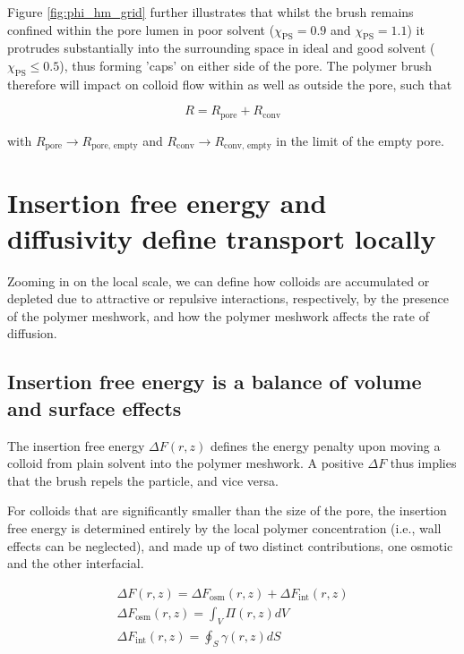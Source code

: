 \documentclass[12pt, a4paper]{article}
\begin{document}
Figure \ref{fig:phi_hm_grid} further illustrates that whilst the brush remains confined within the pore lumen in poor solvent ($\chi_{\text{PS}}=0.9$ and $\chi_{\text{PS}}=1.1$) 
it protrudes substantially into the surrounding space in ideal and good solvent ($\chi_{\text{PS}}\le0.5$), thus forming 'caps' on either side of the pore.  
The polymer brush therefore will impact on colloid flow within as well as outside the pore, such that

\begin{equation}
    R=R_{\text{pore}}+R_{\text{conv}}
    \label{eq:R_tot_tot}
\end{equation}
    
\noindent with $R_{\text{pore}}\rightarrow R_{\text{pore, empty}}$ and $R_{\text{conv}}\rightarrow R_{\text{conv, empty}}$ in the limit of the empty pore. 


\section{Insertion free energy and diffusivity define transport locally}

Zooming in on the local scale, we can define how colloids are accumulated or depleted due to attractive or repulsive interactions, respectively, by the presence of the polymer meshwork, 
and how the polymer meshwork affects the rate of diffusion.

\subsection{Insertion free energy is a balance of volume and surface effects}

The insertion free energy $\Delta F(r,z)$ defines the energy penalty upon moving a colloid from plain solvent into the polymer meshwork.
A positive $\Delta F$ thus implies that the brush repels the particle, and vice versa.

For colloids that are significantly smaller than the size of the pore, the insertion free energy is determined entirely by the local polymer concentration (i.e., wall effects can be neglected), 
and made up of two distinct contributions, one osmotic and the other interfacial.

\begin{eqnarray}
    \Delta F (r,z)= \Delta F_{\text{osm}}(r,z) + \Delta F_{\text{int}}(r,z)
    \\
    \Delta F_{\text{osm}}(r,z) = \int_{V} \Pi(r,z) dV
    \\
    \Delta F_{\text{int}}(r,z) = \oint_{S} \gamma (r,z) dS
    \label{eq:Delta_F}
\end{eqnarray}
\end{document}
